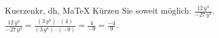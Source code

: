 \begin{MAufgabe}{Kuerzen}{kr, dh, MaTeX}
K\"urzen Sie soweit m\"oglich: $\frac{12\, y^4}{- 27\, y^4}$.\\ 
\ifLsg\MLoesung
\quad $\frac{12\, y^4}{- 27\, y^4}=\frac{(3\, y^4)\cdot(4)}{(3\, y^4)\cdot(-9)}=\frac{4}{-9}=\frac{-4}{9}$.\else\relax\fi
 \end{MAufgabe}